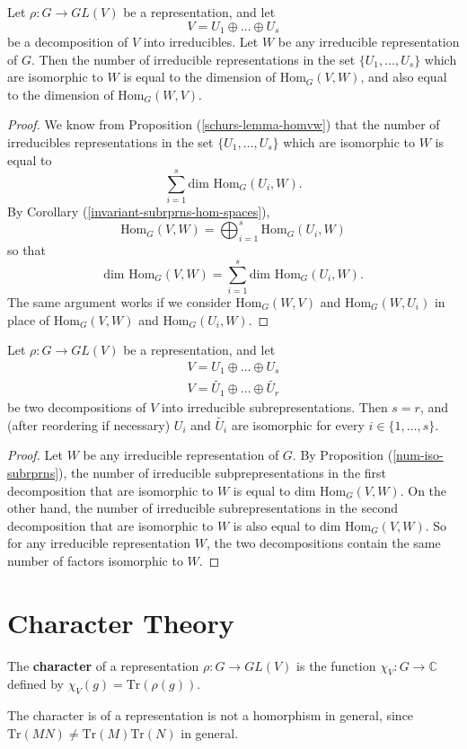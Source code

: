 \begin{prop}\label{num-iso-subrprns}
Let $\rho \colon G \to GL(V)$ be a representation, and let \[ V = U_1 \oplus \ldots \oplus U_s \] be a decomposition of $V$ into irreducibles.  Let $W$ be any irreducible representation of $G$.  Then the number of irreducible representations in the set  $ \{ U_1, \ldots, U_s \}$ which are isomorphic to $W$ is equal to the dimension of $\text{Hom}_G(V,W)$, and also equal to the dimension of $\text{Hom}_G(W,V)$.
\end{prop}
\begin{proof}
We know from Proposition (\ref{schurs-lemma-homvw}) that the number of irreducibles representations in the set  $ \{ U_1, \ldots, U_s \}$ which are isomorphic to $W$ is equal to \[ \sum_{i=1}^s \text{dim Hom}_G(U_i,W). \]
By Corollary (\ref{invariant-subrprns-hom-spaces}), \[ \text{Hom}_G(V,W) = \bigoplus_{i=1}^s \text{Hom}_G(U_i, W) \]
so that \[  \text{dim Hom}_G(V,W) = \sum_{i=1}^s \text{dim Hom}_G(U_i, W). \]
The same argument works if we consider $\text{Hom}_G(W,V)$ and $\text{Hom}_G(W,U_i)$ in place of $\text{Hom}_G(V,W)$ and $\text{Hom}_G(U_i,W)$.
\end{proof}

\begin{thm}
Let $\rho \colon G \to GL(V)$ be a representation, and let
\begin{align*}
V = U_1 \oplus \ldots \oplus U_s \\
V = \tilde{U_1} \oplus \ldots \oplus \tilde{U_r}
\end{align*}
be two decompositions of $V$ into irreducible subrepresentations.  Then $s = r$, and (after reordering if necessary) $U_i$ and $\tilde{U_i}$ are isomorphic for every $i \in \{1, \ldots, s\}$.
\end{thm}
\begin{proof}
Let $W$ be any irreducible representation of $G$.  By Proposition (\ref{num-iso-subrprns}), the number of irreducible subprepresentations in the first decomposition that are isomorphic to $W$ is equal to $\text{dim Hom}_G(V,W)$.  On the other hand, the number of irreducible subrepresentations in the second decomposition that are isomorphic to $W$ is also equal to $\text{dim Hom}_G(V,W)$.  So for any irreducible representation $W$, the two decompositions contain the same number of factors isomorphic to $W$.
\end{proof}


\section{Character Theory}
\begin{defn}
The \textbf{character} of a representation $\rho \colon G \to GL(V)$ is the function $\chi_V \colon G \to \mathbb{C}$ defined by $\chi_V(g) = \text{Tr}(\rho(g))$.
\end{defn}
\begin{note}
The character is of a representation is not a homorphism in general, since $\text{Tr}(MN) \neq \text{Tr}(M) \text{Tr}(N)$ in general.
\end{note}

